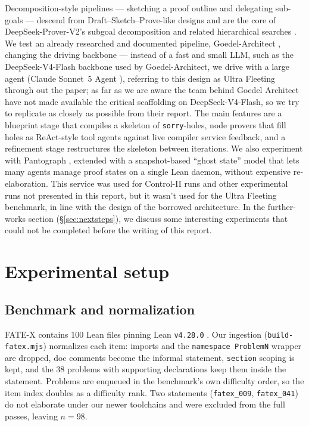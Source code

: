\documentclass[12pt, a4paper]{article}
\newcommand{\run}[1]{\texttt{#1}}
\begin{document}
Decomposition-style pipelines --- sketching a proof outline and delegating
sub-goals --- descend from Draft--Sketch--Prove-like designs and are the core of
DeepSeek-Prover-V2's subgoal decomposition \cite{deepseekproverv2} and related
hierarchical searches \cite{lample2022hypertree,decomposition_openreview}. We test an already
researched and documented pipeline, Goedel-Architect \cite{goedelarchitect}, changing the driving
backbone --- instead of a fast and small LLM, such as the DeepSeek-V4-Flash backbone used by
Goedel-Architect, we drive with a large agent (Claude Sonnet~5 Agent \cite{anthropic2026sonnet5}),
referring to this design as Ultra Fleeting through out the paper;
as far as we are aware the team behind Goedel Architect have not made available the critical
scaffolding on DeepSeek-V4-Flash, so we try to replicate as closely as possible from their report.
The main features are a blueprint stage that compiles a skeleton of \texttt{sorry}-holes, 
node provers that fill holes as ReAct-style tool agents \cite{yao2023react} against live compiler service feedback, 
and a refinement stage restructures the skeleton between iterations. We also experiment with 
Pantograph \cite{aniva2024pantograph,pypantograph}, extended with a
snapshot-based ``ghost state'' model \cite{shen2026snapshot,leakii2026upgrade}
that lets many agents manage proof states on a single Lean daemon, without expensive re-elaboration. 
This service was used for Control-II runs and other experimental runs not presented in this report, 
but it wasn't used for the Ultra Fleeting benchmark, in line with the design of
the borrowed architecture. In the further-works section (\S\ref{sec:nextsteps}), we discuss some
interesting experiments that could not be completed before the writing of this report.

\section{Experimental setup}

\subsection{Benchmark and normalization}
\label{sec:benchmark}

FATE-X contains 100 Lean files pinning Lean \texttt{v4.28.0} \cite{fatex2025}.
Our ingestion (\run{build-fatex.mjs}) normalizes each item: imports and the
\texttt{namespace ProblemN} wrapper are dropped, doc comments become the
informal statement, \texttt{section} scoping is kept, and the 38 problems with
supporting declarations keep them inside the statement. Problems are enqueued
in the benchmark's own difficulty order, so the item index doubles as a
difficulty rank. Two statements (\run{fatex\_009}, \run{fatex\_041}) do not
elaborate under our newer toolchains and were excluded from the full passes,
leaving $n=98$.
\end{document}
